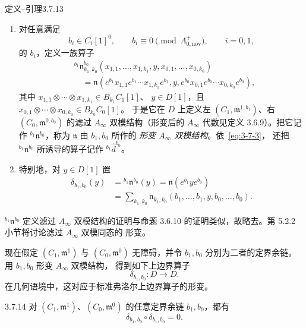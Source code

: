 \begin{statement}{定义--引理}{3.7.13}\label{def-lem:3-7-13}
\begin{enumerate}[label=\textup{(\arabic*)},leftmargin=2.8em]
  \item 对任意满足
  \[
    b_i\in C_i[1]^0,
    \qquad b_i\equiv0\pmod{\Lambda^+_{0,\mathrm{nov}}},
    \qquad i=0,1,
  \]
  的 $b_i$，定义一族算子
  \[
  \begin{aligned}
  &{}^{b_1}\mathfrak n_{k_1,k_0}^{b_0}
  (x_{1,1},\ldots,x_{1,k_1},y,x_{0,1},\ldots,x_{0,k_0})\\
  &\quad=
  \mathfrak n(e^{b_1}x_{1,1}e^{b_1}\cdots x_{1,k_1}e^{b_1},
    y,e^{b_0}x_{0,1}e^{b_0}\cdots x_{0,k_0}e^{b_0}),
  \end{aligned}
  \]
  其中
  $x_{1,1}\otimes\cdots\otimes x_{1,k_1}\in B_{k_1}C_1[1]$、
  $y\in D[1]$，且
  $x_{0,1}\otimes\cdots\otimes x_{0,k_0}\in B_{k_0}C_0[1]$。
  于是它在 $D$ 上定义左
  $(C_1,\mathfrak m^{1,b_1})$、右
  $(C_0,\mathfrak m^{0,b_0})$ 的滤过 $A_\infty$ 双模结构（形变后的
  $A_\infty$ 代数见定义 3.6.9）。把它记作
  ${}^{b_1}\mathfrak n^{b_0}$，称为 $\mathfrak n$ 由 $b_1,b_0$ 所作的
  \emph{形变 $A_\infty$ 双模结构}。依~\eqref{eq:3-7-3}，
  还把 ${}^{b_1}\mathfrak n^{b_0}$ 所诱导的算子记作
  ${}^{b_1}\widehat d^{b_0}$。

  \item 特别地，对 $y\in D[1]$ 置
  \[
  \begin{aligned}
    \delta_{b_1,b_0}(y)
    &={} ^{b_1}\mathfrak n^{b_0}(y)
      =\mathfrak n(e^{b_1}ye^{b_0})\\
    &=\sum_{k_1,k_0}
      \mathfrak n_{k_1,k_0}
      (b_1,\ldots,b_1,y,b_0,\ldots,b_0).
  \end{aligned}
  \]
\end{enumerate}
\end{statement}

${}^{b_1}\mathfrak n^{b_0}$ 定义滤过 $A_\infty$ 双模结构的证明与命题
3.6.10 的证明类似，故略去。第 5.2.2 小节将讨论滤过 $A_\infty$ 双模同态的
形变。

现在假定 $(C_1,\mathfrak m^1)$ 与 $(C_0,\mathfrak m^0)$ 无障碍，并令
$b_1,b_0$ 分别为二者的定界余链。用 $b_1,b_0$ 形变 $A_\infty$ 双模结构，
得到如下上边界算子
\[
  \delta_{b_1,b_0}\colon D\longrightarrow D.
\]
在几何语境中，这对应于标准弗洛尔上边界算子的形变。

\begin{lemma}{3.7.14}\label{lem:3-7-14}
对 $(C_1,\mathfrak m^1)$、$(C_0,\mathfrak m^0)$ 的任意定界余链
$b_1,b_0$，都有
\[
  \delta_{b_1,b_0}\circ\delta_{b_1,b_0}=0.
\]
\end{lemma}

